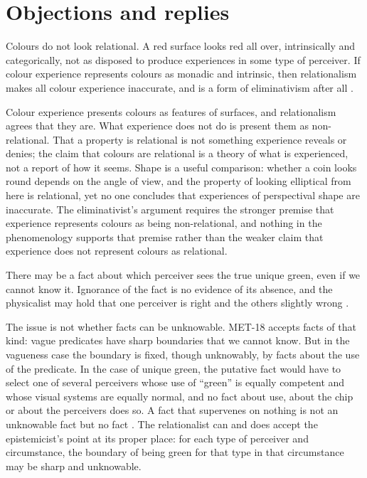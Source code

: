 \documentclass{situationist-preprint}
\begin{document}
\section{Objections and replies}

\begin{objection}[Phenomenology]
Colours do not look relational. A red surface looks red all over, intrinsically and categorically, not as disposed to produce experiences in some type of perceiver. If colour experience represents colours as monadic and intrinsic, then relationalism makes all colour experience inaccurate, and is a form of eliminativism after all \citep{BoghossianVelleman1989}.
\end{objection}

\begin{reply}
Colour experience presents colours as features of surfaces, and relationalism agrees that they are. What experience does not do is present them as non-relational. That a property is relational is not something experience reveals or denies; the claim that colours are relational is a theory of what is experienced, not a report of how it seems. Shape is a useful comparison: whether a coin looks round depends on the angle of view, and the property of looking elliptical from here is relational, yet no one concludes that experiences of perspectival shape are inaccurate. The eliminativist's argument requires the stronger premise that experience represents colours as being non-relational, and nothing in the phenomenology supports that premise rather than the weaker claim that experience does not represent colours as relational.
\end{reply}

\begin{objection}
There may be a fact about which perceiver sees the true unique green, even if we cannot know it. Ignorance of the fact is no evidence of its absence, and the physicalist may hold that one perceiver is right and the others slightly wrong \citep{Tye2006}.
\end{objection}

\begin{reply}
The issue is not whether facts can be unknowable. MET-18 accepts facts of that kind: vague predicates have sharp boundaries that we cannot know. But in the vagueness case the boundary is fixed, though unknowably, by facts about the use of the predicate. In the case of unique green, the putative fact would have to select one of several perceivers whose use of \enquote{green} is equally competent and whose visual systems are equally normal, and no fact about use, about the chip or about the perceivers does so. A fact that supervenes on nothing is not an unknowable fact but no fact \citep{CohenHardinMcLaughlin2006}. The relationalist can and does accept the epistemicist's point at its proper place: for each type of perceiver and circumstance, the boundary of being green for that type in that circumstance may be sharp and unknowable.
\end{reply}
\end{document}
